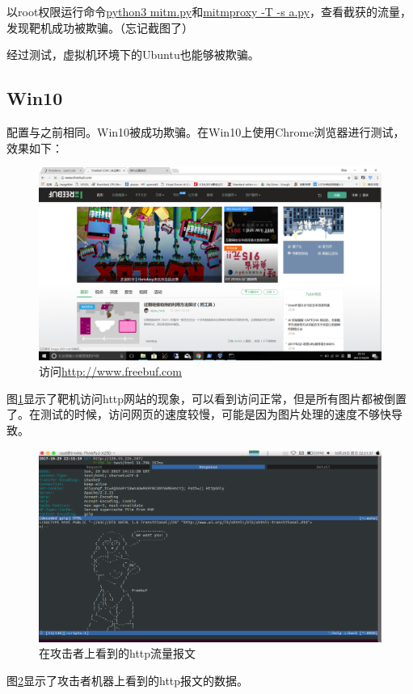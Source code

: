 \documentclass[a4paper]{article}
\begin{document}
以root权限运行命令\uline{python3 mitm.py}和\uline{mitmproxy -T -s a.py}，查看截获的流量，发现靶机成功被欺骗。（忘记截图了）

经过测试，虚拟机环境下的Ubuntu也能够被欺骗。
\subsection{Win10}
配置与之前相同。Win10被成功欺骗。在Win10上使用Chrome浏览器进行测试，效果如下：

\begin{figure}[htp]
\centering
\includegraphics[width=0.9\linewidth]{freebuf.png}
\caption{访问\uline{http://www.freebuf.com}}
\label{fig:freebuf}
\end{figure}

图\ref{fig:freebuf}显示了靶机访问http网站的现象，可以看到访问正常，但是所有图片都被倒置了。在测试的时候，访问网页的速度较慢，可能是因为图片处理的速度不够快导致。

\begin{figure}[htp]
\centering
\includegraphics[width=0.9\linewidth]{request.png}
\caption{在攻击者上看到的http流量报文}
\label{fig:request}
\end{figure}

图\ref{fig:request}显示了攻击者机器上看到的http报文的数据。
\end{document}
